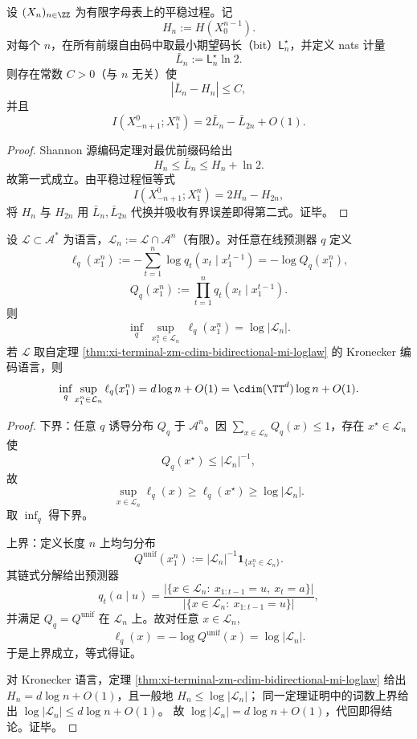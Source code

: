 \begin{proposition}\label{prop:xi-terminal-zm-godel-prefix-code-mi-difference}
设 \((X_n)_{n\in\ZZ}\) 为有限字母表上的平稳过程。记
\[
H_n:=H(X_0^{n-1}).
\]
对每个 \(n\)，在所有前缀自由码中取最小期望码长（bit）\(\mathsf L_n^\star\)，并定义 nats 计量
\[
\bar L_n:=\mathsf L_n^\star\ln 2.
\]
则存在常数 \(C>0\)（与 \(n\) 无关）使
\[
|\bar L_n-H_n|\le C,
\]
并且
\[
I(X_{-n+1}^{0};X_1^n)=2\bar L_n-\bar L_{2n}+O(1).
\]
\end{proposition}
\begin{proof}
Shannon 源编码定理对最优前缀码给出
\[
H_n\le \bar L_n\le H_n+\ln 2.
\]
故第一式成立。由平稳过程恒等式
\[
I(X_{-n+1}^{0};X_1^n)=2H_n-H_{2n},
\]
将 \(H_n\) 与 \(H_{2n}\) 用 \(\bar L_n,\bar L_{2n}\) 代换并吸收有界误差即得第二式。证毕。
\end{proof}

\begin{theorem}[语言复杂度对数等于最小极大在线对数损失]\label{thm:xi-terminal-zm-language-minimax-logloss}
设 \(\mathcal L\subset\mathcal A^\ast\) 为语言，\(\mathcal L_n:=\mathcal L\cap\mathcal A^n\)（有限）。对任意在线预测器 \(q\) 定义
\[
\ell_q(x_1^n):=-\sum_{t=1}^n\log q_t(x_t\mid x_1^{t-1})
=-\log Q_q(x_1^n),
\]
\[
Q_q(x_1^n):=\prod_{t=1}^n q_t(x_t\mid x_1^{t-1}).
\]
则
\[
\inf_q\ \sup_{x_1^n\in\mathcal L_n}\ \ell_q(x_1^n)=\log|\mathcal L_n|.
\]
若 \(\mathcal L\) 取自定理 \ref{thm:xi-terminal-zm-cdim-bidirectional-mi-loglaw} 的 Kronecker 编码语言，则
\[
\inf_q\sup_{x_1^n\in\mathcal L_n}\ell_q(x_1^n)=d\log n+O(1)
=\cdim(\TT^d)\log n+O(1).
\]
\end{theorem}
\begin{proof}
下界：任意 \(q\) 诱导分布 \(Q_q\) 于 \(\mathcal A^n\)。因
\(
\sum_{x\in\mathcal L_n}Q_q(x)\le 1
\)，存在 \(x^\star\in\mathcal L_n\) 使
\[
Q_q(x^\star)\le |\mathcal L_n|^{-1},
\]
故
\[
\sup_{x\in\mathcal L_n}\ell_q(x)\ge \ell_q(x^\star)\ge \log|\mathcal L_n|.
\]
取 \(\inf_q\) 得下界。

上界：定义长度 \(n\) 上均匀分布
\[
Q^{\mathrm{unif}}(x_1^n):=|\mathcal L_n|^{-1}\mathbf 1_{\{x_1^n\in\mathcal L_n\}}.
\]
其链式分解给出预测器
\[
q_t(a\mid u)=
\frac{|\{x\in\mathcal L_n:\ x_{1:t-1}=u,\ x_t=a\}|}
{|\{x\in\mathcal L_n:\ x_{1:t-1}=u\}|},
\]
并满足 \(Q_q=Q^{\mathrm{unif}}\) 在 \(\mathcal L_n\) 上。故对任意 \(x\in\mathcal L_n\),
\[
\ell_q(x)=-\log Q^{\mathrm{unif}}(x)=\log|\mathcal L_n|.
\]
于是上界成立，等式得证。

对 Kronecker 语言，定理 \ref{thm:xi-terminal-zm-cdim-bidirectional-mi-loglaw} 给出
\(
H_n=d\log n+O(1)
\)，且一般地 \(H_n\le \log|\mathcal L_n|\)；
同一定理证明中的词数上界给出 \(\log|\mathcal L_n|\le d\log n+O(1)\)。
故 \(\log|\mathcal L_n|=d\log n+O(1)\)，代回即得结论。证毕。
\end{proof}

